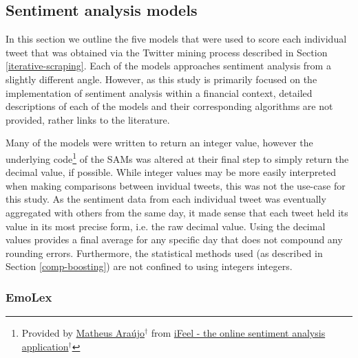 \documentclass{article}
\begin{document}
\subsection{Sentiment analysis models \label{sent-anal}}
\label{sec-4-4}

In this section we outline the five models that were used to score each individual tweet that was obtained via the Twitter mining process described in Section \ref{iterative-scraping}. Each of the models approaches sentiment analysis from a slightly different angle. However, as this study is primarily focused on the implementation of sentiment analysis within a financial context, detailed descriptions of each of the models and their corresponding algorithms are not provided, rather links to the literature.

Many of the models were written to return an integer value, however the underlying code\footnote{Provided by \href{https://matheusaraujo.com/my-self/#mainpublications}{Matheus Araújo$^{\dag{}}$} from \href{http://blackbird.dcc.ufmg.br:1210/}{iFeel - the online sentiment analysis application$^{\dag{}}$}} of the SAMs was altered at their final step to simply return the decimal value, if possible. While integer values may be more easily interpreted when making comparisons between invidual tweets, this was not the use-case for this study. As the sentiment data from each individual tweet was eventually aggregated with others from the same day, it made sense that each tweet held its value in its most precise form, i.e. the raw decimal value. Using the decimal values provides a final average for any specific day that does not compound any rounding errors. Furthermore, the statistical methods used (as described in Section \ref{comp-boosting}) are not confined to using integers integers.


\subsubsection{EmoLex \label{emolex}}
\label{sec-4-4-1}
\end{document}
